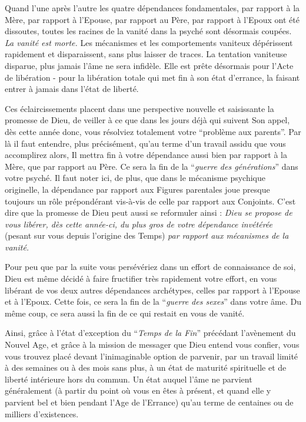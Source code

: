 
Quand l'une après l'autre les quatre dépendances fondamentales, par rapport à la Mère, par rapport à l'Epouse, par rapport au Père, par rapport à l'Epoux ont été dissoutes, toutes les racines de la vanité dans la psyché sont désormais coupées. \textit{La vanité est morte.} Les mécanismes et les comportements vaniteux dépérissent rapidement et disparaissent, sans plus laisser de traces. La tentation vaniteuse disparue, plus jamais l'âme ne sera infidèle. Elle est prête désormais pour l'Acte de libération - pour la libération totale qui met fin à son état d'errance, la faisant entrer à jamais dans l'état de liberté.

Ces éclaircissements placent dans une perspective nouvelle et saisissante la promesse de Dieu, de veiller à ce que dans les jours déjà qui suivent Son appel, dès cette année donc, vous résolviez totalement votre ``problème aux parents''. Par là il faut entendre, plus précisément, qu'au terme d'un travail assidu que vous accomplirez alors, Il mettra fin à votre dépendance aussi bien par rapport à la Mère, que par rapport au Père. Ce sera la fin de la ``\textit{guerre des générations}'' dans votre psyché. Il faut noter ici, de plus, que dans le mécanisme psychique originelle, la dépendance par rapport aux Figures parentales joue presque toujours un rôle prépondérant vis-à-vis de celle par rapport aux Conjoints. C'est dire que la promesse de Dieu peut aussi se reformuler ainsi : \textit{Dieu se propose de vous libérer, dès cette année-ci, du plus gros de votre dépendance invétérée} (pesant sur vous depuis l'origine des Temps) \textit{par rapport aux mécanismes de la vanité.}

Pour peu que par la suite vous persévériez dans un effort de connaissance de soi, Dieu est même décidé à faire fructifier très rapidement votre effort, en vous libérant de vos deux autres dépendances archétypes, celles par rapport à l'Epouse et à l'Epoux. Cette fois, ce sera la fin de la ``\textit{guerre des sexes}'' dans votre âme. Du même coup, ce sera aussi la fin de ce qui restait en vous de vanité.

Ainsi, grâce à l'état d'exception du ``\textit{Temps de la Fin}'' précédant l'avènement du Nouvel Age, et grâce à la mission de messager que Dieu entend vous confier, vous vous trouvez placé devant l'inimaginable option de parvenir, par un travail limité à des semaines ou à des mois sans plus, à un état de maturité spirituelle et de liberté intérieure hors du commun. Un état auquel l'âme ne parvient généralement (à partir du point où vous en êtes à présent, et quand elle y parvient bel et bien pendant l'Age de l'Errance) qu'au terme de centaines ou de milliers d'existences.

